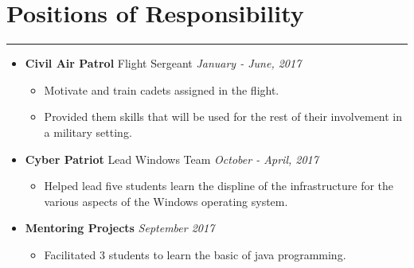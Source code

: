 \documentclass[a4paper]{article}
\begin{document}
\section*{Positions of Responsibility}
\hrule
\vspace{3mm}
\begin{itemize}
	\item
	      \textbf{Civil Air Patrol} Flight Sergeant
	      \hfill \textit{January - June, 2017}
	      \begin{itemize}
	      	\vspace{-2mm} \setlength\itemsep{-0.7mm}
		\item Motivate and train cadets assigned in the flight. 
		\item Provided them skills that will be used for the rest of their involvement in a military setting.
	      \end{itemize}
	\item
	      \textbf{Cyber Patriot} Lead Windows Team
	      \hfill \textit{October - April, 2017}
	      \begin{itemize}
	      	\vspace{-2mm} \setlength\itemsep{-0.7mm}
		\item Helped lead five students learn the displine of the infrastructure for the various aspects of the Windows operating system.
	      \end{itemize}
	\item
	      \textbf{Mentoring Projects}
		  \hfill \textit{September 2017}
	      \begin{itemize}
	      	\vspace{-2mm} \setlength\itemsep{-0.7mm}
	      	\item Facilitated 3 students to learn the basic of java programming.
	      \end{itemize}
\end{itemize}

\end{document}
